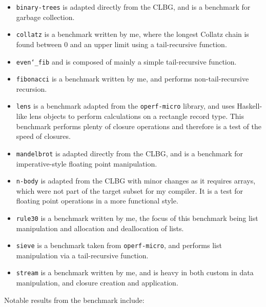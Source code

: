 \documentclass[12pt,a4paper,twoside,openright]{report}
\begin{document}
\begin{itemize}
    \item \texttt{binary-trees} is adapted directly from the CLBG, and is a 
    benchmark for garbage collection.
    
    \item \texttt{collatz} is a benchmark written by me, where the longest 
    Collatz chain is found between 0 and an upper limit using a tail-recursive 
    function.
    
    \item \texttt{even\char`_fib} and is composed of mainly a simple 
    tail-recursive function.
    
    \item \texttt{fibonacci} is a benchmark written by me, and performs 
    non-tail-recursive recursion.
    
    \item \texttt{lens} is a benchmark adapted from the \texttt{operf-micro} 
    library, and uses Haskell-like lens objects to perform calculations on a 
    rectangle record type. This benchmark performs plenty of closure operations 
    and therefore is a test of the speed of closures.
    
    \item \texttt{mandelbrot} is adapted directly from the CLBG, and is a 
    benchmark for imperative-style floating point manipulation.
    
    \item \texttt{n-body} is adapted from the CLBG with minor changes as it 
    requires arrays, which were not part of the target subset for my compiler. 
    It is a test for floating point operations in a more functional style.
    
    \item \texttt{rule30} is a benchmark written by me, the focus of this 
    benchmark being list manipulation and allocation and deallocation of lists.
    
    \item \texttt{sieve} is a benchmark taken from \texttt{operf-micro}, and 
    performs list manipulation via a tail-recursive function.
    
    \item \texttt{stream} is a benchmark written by me, and is heavy in both 
    custom in data manipulation, and closure creation and application.
    
\end{itemize}

Notable results from the benchmark include:
\end{document}
